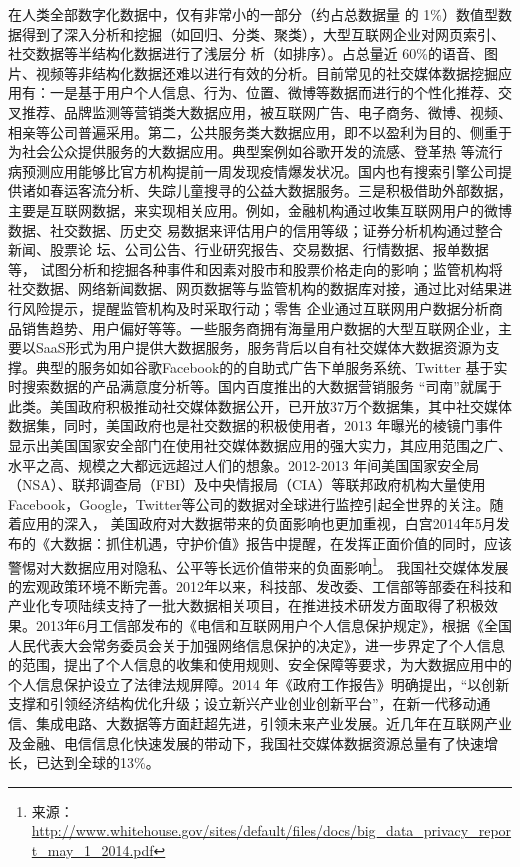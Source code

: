 在人类全部数字化数据中，仅有非常小的一部分（约占总数据量 的 1\%）数值型数据得到了深入分析和挖掘（如回归、分类、聚类），大型互联网企业对网页索引、社交数据等半结构化数据进行了浅层分
析（如排序）。占总量近 60\%的语音、图片、视频等非结构化数据还难以进行有效的分析。目前常见的社交媒体数据挖掘应用有：一是基于用户个人信息、行为、位置、微博等数据而进行的个性化推荐、交叉推荐、品牌监测等营销类大数据应用，被互联网广告、电子商务、微博、视频、相亲等公司普遍采用。第二，公共服务类大数据应用，即不以盈利为目的、侧重于为社会公众提供服务的大数据应用。典型案例如谷歌开发的流感、登革热 等流行病预测应用能够比官方机构提前一周发现疫情爆发状况。国内也有搜索引擎公司提供诸如春运客流分析、失踪儿童搜寻的公益大数据服务。三是积极借助外部数据，主要是互联网数据，来实现相关应用。例如，金融机构通过收集互联网用户的微博数据、社交数据、历史交 易数据来评估用户的信用等级；证券分析机构通过整合新闻、股票论 坛、公司公告、行业研究报告、交易数据、行情数据、报单数据等， 试图分析和挖掘各种事件和因素对股市和股票价格走向的影响；监管机构将社交数据、网络新闻数据、网页数据等与监管机构的数据库对接，通过比对结果进行风险提示，提醒监管机构及时采取行动；零售 企业通过互联网用户数据分析商品销售趋势、用户偏好等等。一些服务商拥有海量用户数据的大型互联网企业，主要以SaaS形式为用户提供大数据服务，服务背后以自有社交媒体大数据资源为支撑。典型的服务如如谷歌Facebook的的自助式广告下单服务系统、Twitter 基于实时搜索数据的产品满意度分析等。国内百度推出的大数据营销服务 “司南”就属于此类。美国政府积极推动社交媒体数据公开，已开放37万个数据集，其中社交媒体数据集，同时，美国政府也是社交数据的积极使用者，2013 年曝光的棱镜门事件显示出美国国家安全部门在使用社交媒体数据应用的强大实力，其应用范围之广、水平之高、规模之大都远远超过人们的想象。2012-2013 年间美国国家安全局 （NSA）、联邦调查局（FBI）及中央情报局（CIA）等联邦政府机构大量使用Facebook，Google，Twitter等公司的数据对全球进行监控引起全世界的关注。随着应用的深入， 美国政府对大数据带来的负面影响也更加重视，白宫2014年5月发 布的《大数据：抓住机遇，守护价值》报告中提醒，在发挥正面价值的同时，应该警惕对大数据应用对隐私、公平等长远价值带来的负面影响\footnote{来源：\url{http://www.whitehouse.gov/sites/default/files/docs/big_data_privacy_report_may_1_2014.pdf}}。
我国社交媒体发展的宏观政策环境不断完善。2012年以来，科技部、发改委、工信部等部委在科技和产业化专项陆续支持了一批大数据相关项目，在推进技术研发方面取得了积极效果。2013年6月工信部发布的《电信和互联网用户个人信息保护规定》，根据《全国人民代表大会常务委员会关于加强网络信息保护的决定》，进一步界定了个人信息的范围，提出了个人信息的收集和使用规则、安全保障等要求，为大数据应用中的个人信息保护设立了法律法规屏障。2014 年《政府工作报告》明确提出，“以创新支撑和引领经济结构优化升级；设立新兴产业创业创新平台”，在新一代移动通信、集成电路、大数据等方面赶超先进，引领未来产业发展。近几年在互联网产业及金融、电信信息化快速发展的带动下，我国社交媒体数据资源总量有了快速增长，已达到全球的13\%。

